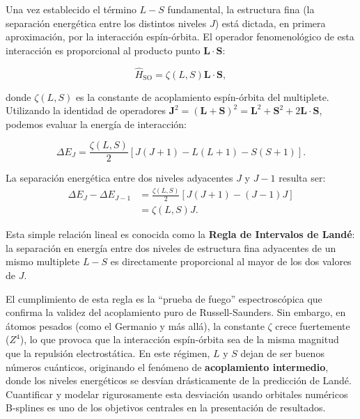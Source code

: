 Una vez establecido el término $L-S$ fundamental, la estructura fina (la separación energética entre los distintos niveles $J$) está dictada, en primera aproximación, por la interacción espín-órbita. El operador fenomenológico de esta interacción es proporcional al producto punto $\mathbf{L} \cdot \mathbf{S}$:

\begin{equation}
    \hat{H}_{\text{SO}} = \zeta(L,S) \mathbf{L} \cdot \mathbf{S},
\end{equation}

donde $\zeta(L,S)$ es la constante de acoplamiento espín-órbita del multiplete. Utilizando la identidad de operadores $\mathbf{J}^2 = (\mathbf{L} + \mathbf{S})^2 = \mathbf{L}^2 + \mathbf{S}^2 + 2\mathbf{L} \cdot \mathbf{S}$, podemos evaluar la energía de interacción:

\begin{equation}
    \Delta E_J = \frac{\zeta(L,S)}{2} \left[ J(J+1) - L(L+1) - S(S+1) \right].
\end{equation}

La separación energética entre dos niveles adyacentes $J$ y $J-1$ resulta ser:
\begin{align}
    \Delta E_J - \Delta E_{J-1} &= \frac{\zeta(L,S)}{2} \left[ J(J+1) - (J-1)J \right] \nonumber \\
    &= \zeta(L,S) J.
\end{align}

Esta simple relación lineal es conocida como la \textbf{Regla de Intervalos de Landé}: la separación en energía entre dos niveles de estructura fina adyacentes de un mismo multiplete $L-S$ es directamente proporcional al mayor de los dos valores de $J$.

El cumplimiento de esta regla es la ``prueba de fuego'' espectroscópica que confirma la validez del acoplamiento puro de Russell-Saunders. Sin embargo, en átomos pesados (como el Germanio y más allá), la constante $\zeta$ crece fuertemente ($Z^4$), lo que provoca que la interacción espín-órbita sea de la misma magnitud que la repulsión electrostática. En este régimen, $L$ y $S$ dejan de ser buenos números cuánticos, originando el fenómeno de \textbf{acoplamiento intermedio}, donde los niveles energéticos se desvían drásticamente de la predicción de Landé. Cuantificar y modelar rigurosamente esta desviación usando orbitales numéricos B-splines es uno de los objetivos centrales en la presentación de resultados.
